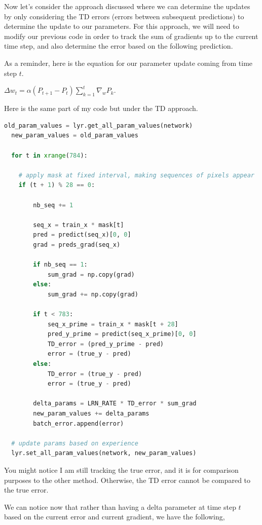 \documentclass{article}
\begin{document}
Now let's consider the approach discussed where we can determine the updates by only considering the TD errors (errors between subsequent predictions) to determine the update to our parameters. For this approach, we will need to modify our previous code in order to track the sum of gradients up to the current time step, and also determine the error based on the following prediction.

As a reminder, here is the equation for our parameter update coming from time step $t$.

$\Delta w_t = \alpha (P_{t+1} - P_t) \sum \limits_{k=1}^t \nabla_w P_k$.

Here is the same part of my code but under the TD approach.

\begin{lstlisting}[language=Python]
  old_param_values = lyr.get_all_param_values(network)
  new_param_values = old_param_values

  for t in xrange(784):

    # apply mask at fixed interval, making sequences of pixels appear
    if (t + 1) % 28 == 0:

        nb_seq += 1

        seq_x = train_x * mask[t]
        pred = predict(seq_x)[0, 0]
        grad = preds_grad(seq_x)

        if nb_seq == 1:
            sum_grad = np.copy(grad)
        else:
            sum_grad += np.copy(grad)

        if t < 783:
            seq_x_prime = train_x * mask[t + 28]
            pred_y_prime = predict(seq_x_prime)[0, 0]
            TD_error = (pred_y_prime - pred)
            error = (true_y - pred)
        else:
            TD_error = (true_y - pred)
            error = (true_y - pred)

        delta_params = LRN_RATE * TD_error * sum_grad
        new_param_values += delta_params
        batch_error.append(error)

  # update params based on experience
  lyr.set_all_param_values(network, new_param_values)
\end{lstlisting}

You might notice I am still tracking the true error, and it is for comparison purposes to the other method. Otherwise, the TD error cannot be compared to the true error.

We can notice now that rather than having a delta parameter at time step $t$ based on the current error and current gradient, we have the following,
\end{document}
